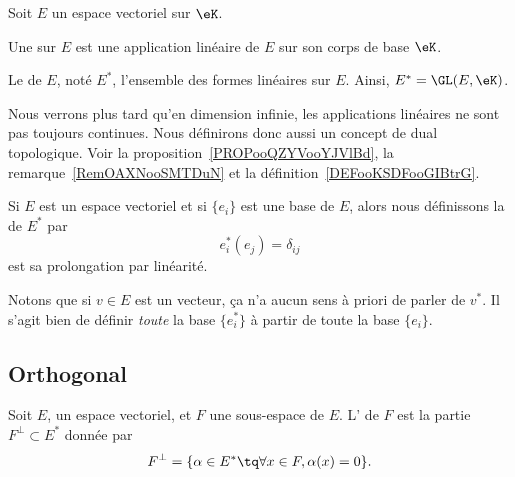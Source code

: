 \begin{definition}  \label{DefJPGSHpn}
    Soit \( E\) un espace vectoriel sur \( \eK\).

    Une  sur \( E \) est une application linéaire de \( E \) sur son corps de base \( \eK\).

    Le  de \( E\), noté \( E^*\), l'ensemble des formes linéaires sur \( E\). Ainsi, \( E^* = \GL(E,\eK)\).
\end{definition}

Nous verrons plus tard qu'en dimension infinie, les applications linéaires ne sont pas toujours continues. Nous définirons donc aussi un concept de dual topologique. Voir la proposition~\ref{PROPooQZYVooYJVlBd}, la remarque~\ref{RemOAXNooSMTDuN} et la définition~\ref{DEFooKSDFooGIBtrG}.

\begin{definition}      \label{DEFooTMSEooZFtsqa}
    Si \( E\) est un espace vectoriel et si \( \{ e_i \}\) est une base de \( E\), alors nous définissons la  de \( E^*\) par
    \begin{equation}
        e_i^*(e_j)=\delta_{ij}
    \end{equation}
    est sa prolongation par linéarité.
\end{definition}
Notons que si \( v\in E\) est un vecteur, ça n'a aucun sens à priori de parler de \( v^*\). Il s'agit bien de définir \emph{toute} la base \( \{ e_i^* \}\) à partir de toute la base \( \{ e_i \}\).

\subsection{Orthogonal}

\begin{definition}      \label{DEFooEQSMooHVzbfz}
    Soit \( E\), un espace vectoriel, et \( F\) une sous-espace de \( E\). L' de \( F\) est la partie \( F^{\perp}\subset E^*\) donnée par
    \begin{equation}    \label{Eqiiyple}
        F^{\perp}=\{ \alpha\in E^*\tq \forall x\in F,\alpha(x)=0 \}.
    \end{equation}
\end{definition}

